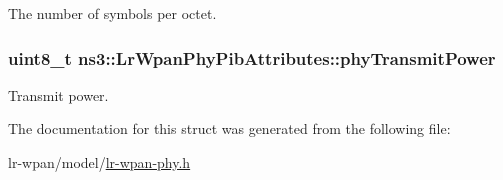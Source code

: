 The number of symbols per octet. 

\subsubsection[{\texorpdfstring{phy\+Transmit\+Power}{phyTransmitPower}}]{\setlength{\rightskip}{0pt plus 5cm}uint8\+\_\+t ns3\+::\+Lr\+Wpan\+Phy\+Pib\+Attributes\+::phy\+Transmit\+Power}\hypertarget{structns3_1_1LrWpanPhyPibAttributes_a3fa4a8802211d54c7b4065fe3f086640}{}\label{structns3_1_1LrWpanPhyPibAttributes_a3fa4a8802211d54c7b4065fe3f086640}


Transmit power. 



The documentation for this struct was generated from the following file\+:\begin{DoxyCompactItemize}
\item 
lr-\/wpan/model/\hyperlink{lr-wpan-phy_8h}{lr-\/wpan-\/phy.\+h}\end{DoxyCompactItemize}
